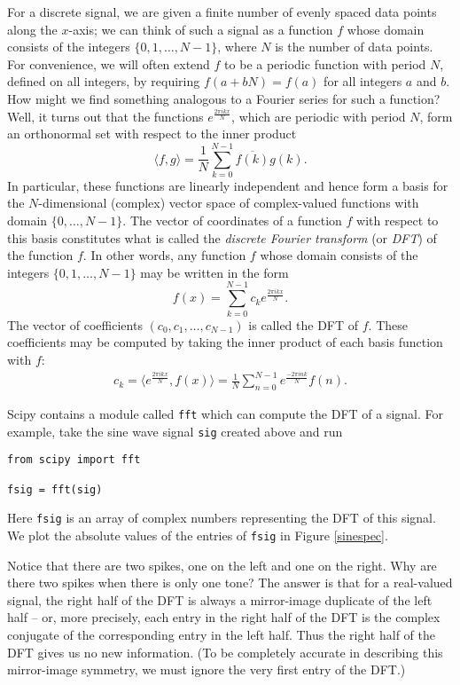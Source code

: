 For a discrete signal, we are given a finite number of evenly spaced data points along the $x$-axis; we can think of such a signal as a function $f$ whose domain consists of the integers $\{0,1,\dots,N-1\}$, where $N$ is the number of data points.
For convenience, we will often extend $f$ to be a periodic function with period $N$, defined on all integers, by requiring $f(a+bN)=f(a)$ for all integers $a$ and $b$.
How might we find something analogous to a Fourier series for such a function?
Well, it turns out that the functions $e^{\frac{2\pi ikx}N}$, which are periodic with period $N$, form an orthonormal set with respect to the inner product
\[
\langle f,g\rangle = \frac1N\sum_{k=0}^{N-1}\overline{f(k)}g(k).
\]
In particular, these functions are linearly independent and hence form a basis for the $N$-dimensional (complex) vector space of complex-valued functions with domain $\{0,\dots,N-1\}$.
The vector of coordinates of a function $f$ with respect to this basis constitutes what is called the \emph{discrete Fourier transform} (or \emph{DFT}) of the function $f$.
In other words, any function $f$ whose domain consists of the integers $\{0,1,\dots,N-1\}$ may be written in the form
\[
f(x)=\sum_{k=0}^{N-1}c_ke^{\frac{2\pi ikx}N}.
\]
The vector of coefficients $(c_0,c_1,\dots,c_{N-1})$ is called the DFT of $f$.
These coefficients may be computed by taking the inner product of each basis function with $f$:
\begin{align}
	c_k=\langle e^{\frac{2\pi ikx}N}, f(x)\rangle=\frac1N\sum_{n=0}^{N-1}e^{\frac{-2\pi ink}N}f(n) . \label{transform_coefficients}
\end{align}

Scipy contains a module called \texttt{fft} which can compute the DFT of a signal. %
For example, take the sine wave signal \texttt{sig} created above and run
\begin{lstlisting}
from scipy import fft

fsig = fft(sig)
\end{lstlisting}
Here \texttt{fsig} is an array of complex numbers representing the DFT of this signal. We plot the absolute values of the entries of \texttt{fsig} in Figure \ref{sinespec}.

Notice that there are two spikes, one on the left and one on the right.
Why are there two spikes when there is only one tone?
The answer is that for a real-valued signal, the right half of the DFT is always a mirror-image duplicate of the left half -- or, more precisely, each entry in the right half of the DFT is the complex conjugate of the corresponding entry in the left half.
Thus the right half of the DFT gives us no new information.
(To be completely accurate in describing this mirror-image symmetry, we must ignore the very first entry of the DFT.)
%



